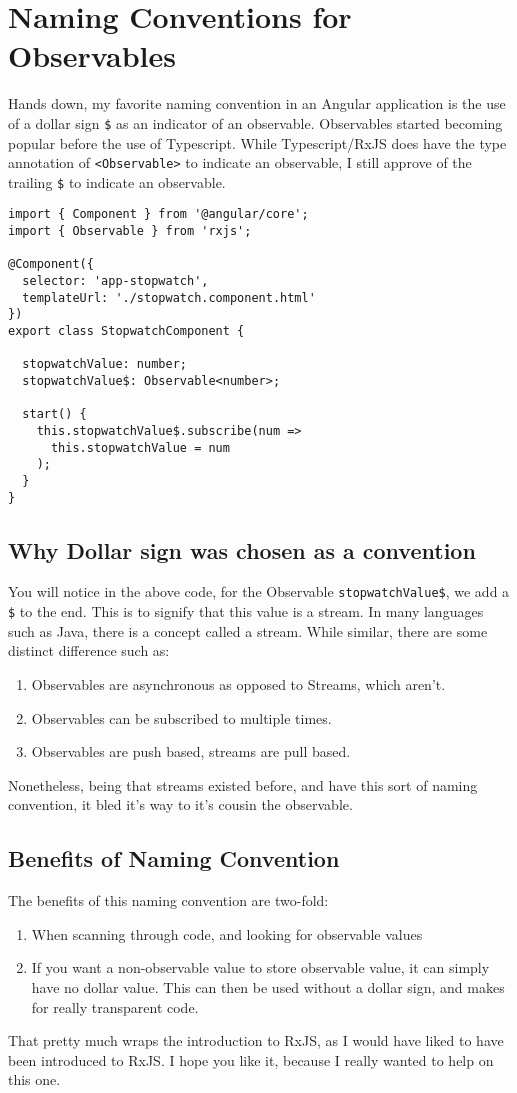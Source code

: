 \section{Naming Conventions for Observables}
Hands down, my favorite naming convention in an Angular application is the use of a 
dollar sign \lstinline{$} as an indicator of an observable. Observables started 
becoming popular before the use of Typescript. While Typescript/RxJS does have 
the type annotation of \lstinline{<Observable>} to indicate an observable, I still
approve of the trailing \lstinline{$} to indicate an observable. 

\begin{lstlisting}[caption=Observable Naming Convention]
import { Component } from '@angular/core';
import { Observable } from 'rxjs';

@Component({
  selector: 'app-stopwatch',
  templateUrl: './stopwatch.component.html'
})
export class StopwatchComponent {

  stopwatchValue: number;
  stopwatchValue$: Observable<number>;

  start() {
    this.stopwatchValue$.subscribe(num =>
      this.stopwatchValue = num
    );
  }
}  
\end{lstlisting}

\subsection{Why Dollar sign was chosen as a convention}
You will notice in the above code, for the Observable 
\lstinline{stopwatchValue$}, we add a \lstinline{$} to the end. This is to 
signify that this value is a stream. In many languages such as Java, there is a 
concept called a stream. While similar, there are some distinct difference such 
as: 
\begin{enumerate}
  \item Observables are asynchronous as opposed to Streams, which aren't.
  \item Observables can be subscribed to multiple times. 
  \item Observables are push based, streams are pull based.
\end{enumerate}

Nonetheless, being that streams existed before, and have this sort of naming 
convention, it bled it's way to it's cousin the observable.

\subsection{Benefits of Naming Convention}
The benefits of this naming convention are two-fold: 
\begin{enumerate}
  \item When scanning through code, and looking for observable values
  \item If you want a non-observable value to store observable value, 
  it can simply have no dollar value. This can then be used without a dollar 
  sign, and makes for really transparent code. 
\end{enumerate}

That pretty much wraps the introduction to RxJS, as I would have liked to 
have been introduced to RxJS. I hope you like it, because I really wanted 
to help on this one.